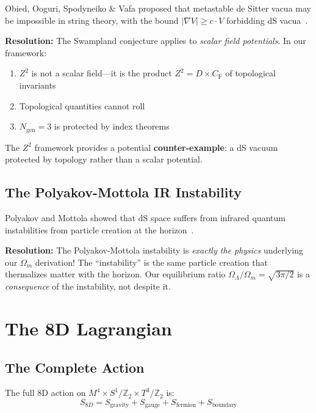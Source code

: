 \documentclass[aps,prd,twocolumn,superscriptaddress,nofootinbib]{revtex4-2}
\newcommand{\Zs}{Z^2}
\newcommand{\CF}{C_{\mathrm{F}}}
\newcommand{\Ngen}{N_{\mathrm{gen}}}
\newcommand{\Omegam}{\Omega_m}
\newcommand{\OmegaL}{\Omega_\Lambda}
\begin{document}
Obied, Ooguri, Spodyneiko \& Vafa proposed that metastable de Sitter vacua may be impossible in string theory, with the bound $|\nabla V| \geq c \cdot V$ forbidding dS vacua~\cite{OOSV2018}.

\textbf{Resolution:} The Swampland conjecture applies to \emph{scalar field potentials}. In our framework:
\begin{enumerate}
\item $\Zs$ is not a scalar field---it is the product $\Zs = D \times \CF$ of topological invariants
\item Topological quantities cannot roll
\item $\Ngen = 3$ is protected by index theorems
\end{enumerate}
The $\Zs$ framework provides a potential \textbf{counter-example}: a dS vacuum protected by topology rather than a scalar potential.

\subsection{The Polyakov-Mottola IR Instability}

Polyakov and Mottola showed that dS space suffers from infrared quantum instabilities from particle creation at the horizon~\cite{Polyakov2012,Mottola1985}.

\textbf{Resolution:} The Polyakov-Mottola instability is \emph{exactly the physics} underlying our $\Omegam$ derivation! The ``instability'' is the same particle creation that thermalizes matter with the horizon. Our equilibrium ratio $\OmegaL/\Omegam = \sqrt{3\pi/2}$ is a \emph{consequence} of the instability, not despite it.

\section{The 8D Lagrangian}
\label{sec:8D}

\subsection{The Complete Action}

The full 8D action on $M^4 \times S^1/\mathbb{Z}_2 \times T^3/\mathbb{Z}_2$ is:
\begin{equation}
S_{8D} = S_{\mathrm{gravity}} + S_{\mathrm{gauge}} + S_{\mathrm{fermion}} + S_{\mathrm{boundary}}
\end{equation}
\end{document}
